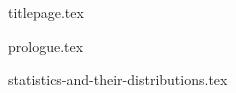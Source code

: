 \documentclass{article}
\begin{document}
{titlepage.tex}

\setcounter{section}{-1}

{prologue.tex}

\tableofcontents

{statistics-and-their-distributions.tex}
\end{document}
